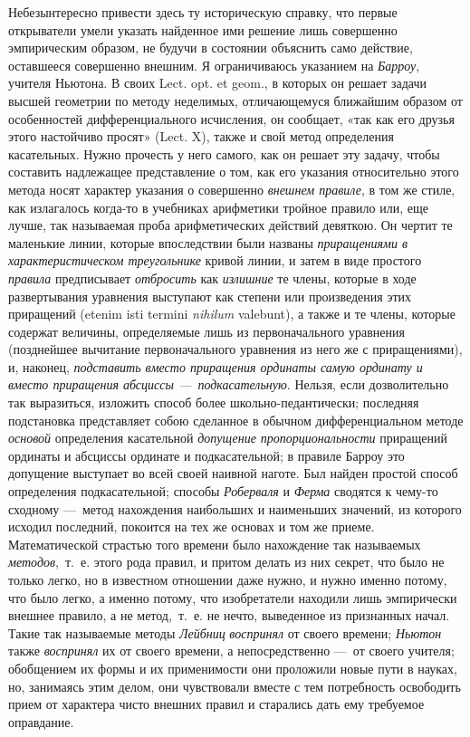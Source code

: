 Небезынтересно привести здесь ту историческую справку, что первые
открыватели умели указать найденное ими решение лишь совершенно
эмпирическим образом, не будучи в состоянии объяснить само действие,
оставшееся совершенно внешним. Я ограничиваюсь указанием на
{\em Барроу}, учителя Ньютона. В своих Lect. opt. et
geom., в которых он решает задачи высшей геометрии по методу неделимых,
отличающемуся ближайшим образом от особенностей дифференциального
исчисления, он сообщает, «так как его друзья этого настойчиво просят»
(Lect. X), также и свой метод определения касательных. Нужно прочесть у
него самого, как он решает эту задачу, чтобы составить надлежащее
представление о том, как его указания относительно этого метода носят
характер указания о совершенно {\em внешнем правиле}, в
том же стиле, как излагалось когда-то в учебниках арифметики тройное
правило или, еще лучше, так называемая проба арифметических действий
девяткою. Он чертит те
маленькие линии, которые впоследствии были названы
{\em приращениями в характеристическом треугольнике}
кривой линии, и затем в виде простого {\em правила}
предписывает {\em отбросить} как
{\em излишние} те члены, которые в ходе развертывания
уравнения выступают как степени или произведения этих приращений (etenim
isti termini {\em nihilum} valebunt), а также и те члены,
которые содержат величины, определяемые лишь из первоначального уравнения
(позднейшее вычитание первоначального уравнения из него же с приращениями),
и, наконец, {\em подставить вместо приращения ординаты
самую ординату и вместо приращения абсциссы —~подкасательную}. Нельзя, если
дозволительно так выразиться, изложить способ более школьно-педантически;
последняя подстановка представляет собою сделанное в обычном
дифференциальном методе {\em основой} определения
касательной {\em допущение пропорциональности}
приращений ординаты и абсциссы ординате и подкасательной; в правиле Барроу
это допущение выступает во всей своей наивной наготе. Был найден простой
способ определения подкасательной; способы
{\em Роберваля} и {\em Ферма}
сводятся к чему-то сходному —~метод нахождения наибольших и наименьших
значений, из которого исходил последний, покоится на тех же основах и том
же приеме. Математической страстью того времени было нахождение так
называемых {\em методов},~т.~е. этого рода правил, и
притом делать из них секрет, что было не только легко, но в известном
отношении даже нужно, и нужно именно потому, что было легко, а именно
потому, что изобретатели находили лишь эмпирически внешнее правило, а не
метод,~т.~е. не нечто, выведенное из признанных начал. Такие так называемые
методы {\em Лейбниц}
{\em воспринял} от своего времени;
{\em Ньютон} также {\em воспринял}
их от своего времени, а непосредственно —~от своего учителя; обобщением их
формы и их применимости они проложили новые пути в науках, но, занимаясь
этим делом, они чувствовали вместе с тем потребность освободить прием от
характера чисто внешних правил и старались дать ему требуемое оправдание.

